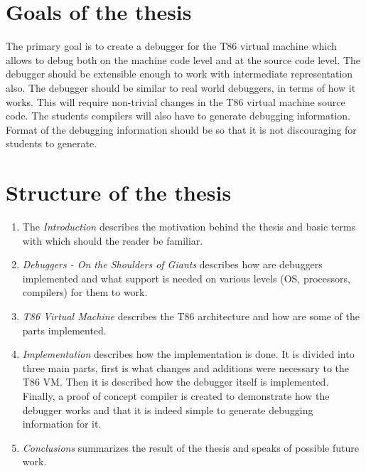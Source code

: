 \section{Goals of the thesis}
The primary goal is to create a debugger for the T86 virtual machine which
allows to debug both on the machine code level and at the source code level.
The debugger should be extensible enough to work with intermediate
representation also. The debugger should be similar to real world debuggers, in
terms of how it works. This will require non-trivial changes in the T86 virtual
machine source code. The students compilers will also have to generate
debugging information. Format of the debugging information should be so that it
is not discouraging for students to generate.

\section{Structure of the thesis}
\begin{enumerate}
    \item The \textit{Introduction} describes the motivation behind the thesis
        and basic terms with which should the reader be familiar.
    \item \textit{Debuggers - On the Shoulders of Giants} describes how are
        debuggers implemented and what support is needed on various levels (OS,
        processors, compilers) for them to work.
    \item \textit{T86 Virtual Machine} describes the T86 architecture and how
        are some of the parts implemented.
    \item \textit{Implementation} describes how the implementation is done. It
        is divided into three main parts, first is what changes and additions
        were necessary to the T86 VM. Then it is described how the debugger
        itself is implemented. Finally, a proof of concept compiler is created
        to demonstrate how the debugger works and that it is indeed simple to
        generate debugging information for it.
    \item \textit{Conclusions} summarizes the result of the thesis and speaks
        of possible future work.
\end{enumerate}

